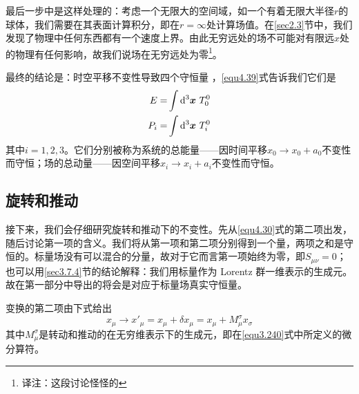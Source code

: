 最后一步中是这样处理的：考虑一个无限大的空间域，如一个有着无限大半径$r$的球体，我们需要在其表面计算积分，即在$r=\infty$处计算场值。在\ref{sec2.3}节中，我们发现了物理中任何东西都有一个速度上界。由此无穷远处的场不可能对有限远$x$处的物理有任何影响，故我们说场在无穷远处为零\footnote{译注：这段讨论怪怪的}。

最终的结论是：时空平移不变性导致四个守恒量%
%
，\ref{equ4.39}式告诉我们它们是
\begin{align}
E =& \int\mathrm d^3\bm{x}~T_0^0 \label{equ4.40}\\
P_i =& \int\mathrm d^3\bm{x}~T_i^0 \label{equ4.41}
\end{align}
其中$i=1,2,3$。它们分别被称为系统的总能量——因时间平移$x_0\rightarrow x_0+a_0$不变性而守恒；场的总动量——因空间平移$x_i\rightarrow x_i+a_i$不变性而守恒。

\subsection{旋转和推动}\label{sec4.5.3}
接下来，我们会仔细研究旋转和推动下的不变性。先从\ref{equ4.30}式的第二项出发，随后讨论第一项的含义。我们将从第一项和第二项分别得到一个量，两项之和是守恒的。标量场没有可以混合的分量，故对于它而言第一项始终为零，即$S_{\mu\nu}=0$；也可以用\ref{sec3.7.4}节的结论解释：我们用标量作为 Lorentz 群一维表示的生成元。故在第一部分中导出的将会是对应于标量场真实守恒量。

变换的第二项由下式给出
\[
x_\mu \rightarrow {x'}_\mu = x_\mu + \delta x_\mu = x_\mu + M_\mu^\sigma x_\sigma
\]
其中$M_\mu^\sigma$是转动和推动的在无穷维表示下的生成元，即在\ref{equ3.240}式中所定义的微分算符。

